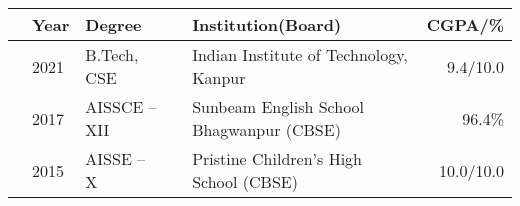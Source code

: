 
\newcommand{\education}[4]{
  & #1 & #2 & &#3 & #4
}
\begin{center}
\begin{tabular}{ | L{0.05cm} l | L{3cm} | L{0.05cm} C{8cm} | r |}
  \hline
  \education{\textbf{Year}}{\textbf{Degree}}{\textbf{Institution(Board)}}{\textbf{CGPA/\%}}\\
  \hline
  \education{2021}{B.Tech, CSE}{Indian Institute of Technology, Kanpur}{9.4/10.0}\\
  \education{2017}{AISSCE -- XII}{Sunbeam English School Bhagwanpur (CBSE)}{96.4\%}\\
  \education{2015}{AISSE -- X}{Pristine Children's High School (CBSE)}{10.0/10.0}\\
  \hline
\end{tabular}
\end{center}
\vspace{-4mm}

